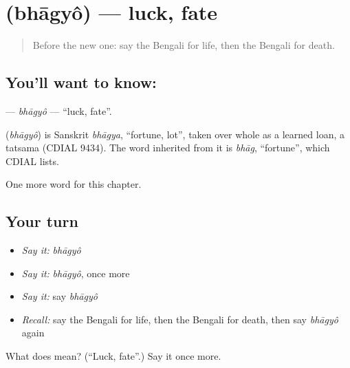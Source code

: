 \section[\texorpdfstring{\bn{ভাগ্য} (bhāgyô)}{ভাগ্য (bhāgyô)}]{ (bhāgyô) — luck, fate}

\label{lesson:BN-C228-bhagyo}



\begin{quote}
Before the new one: say the Bengali for life, then the Bengali for death.
\end{quote}

\subsection*{You'll want to know: }
\textbf{} — \emph{bhāgyô} — \textquotedblleft{}luck, fate\textquotedblright{}.

\begin{cousinweb}
\textbf{} (\emph{bhāgyô}) is Sanskrit \emph{bhāgya}, \textquotedblleft{}fortune, lot\textquotedblright{}, taken over whole as a learned loan, a tatsama (CDIAL 9434). The word inherited from it is \emph{bhāg}, \textquotedblleft{}fortune\textquotedblright{}, which CDIAL lists.
\end{cousinweb}

\begin{grammarlens}[title={What you've built}]
One more word for this chapter.
\end{grammarlens}

\subsection*{Your turn}
\begin{itemize}
\raggedright
  \item \emph{Say it:} \emph{bhāgyô}
  \item \emph{Say it:} \emph{bhāgyô}, once more
  \item \emph{Say it:} say \emph{bhāgyô}
  \item \emph{Recall:} say the Bengali for life, then the Bengali for death, then say \emph{bhāgyô} again
\end{itemize}

\begin{tcolorbox}[breakable,colback=teal!4,colframe=teal!35!black,title={Before you move on}]
What does  mean? (\textquotedblleft{}Luck, fate\textquotedblright{}.) Say it once more.
\end{tcolorbox}

